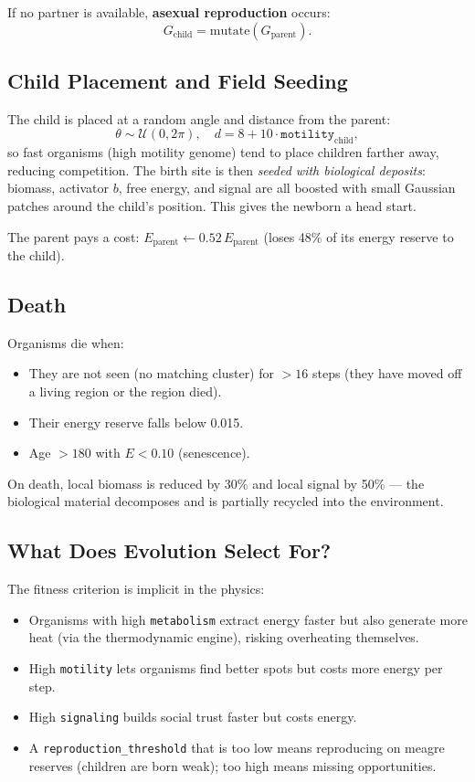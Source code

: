 \documentclass[12pt,a4paper]{article}
\begin{document}
If no partner is available, \textbf{asexual reproduction} occurs:
\[
  G_\text{child} = \text{mutate}(G_\text{parent}).
\]

\subsection{Child Placement and Field Seeding}

The child is placed at a random angle and distance from the parent:
\[
  \theta \sim \mathcal{U}(0, 2\pi),\quad
  d = 8 + 10\cdot\texttt{motility}_\text{child},
\]
so fast organisms (high motility genome) tend to place
children farther away, reducing competition.
The birth site is then \emph{seeded with biological deposits}:
biomass, activator $b$, free energy, and signal are all
boosted with small Gaussian patches around the child's position.
This gives the newborn a head start.

The parent pays a cost:
$E_\text{parent} \leftarrow 0.52\,E_\text{parent}$
(loses 48\% of its energy reserve to the child).

\subsection{Death}

Organisms die when:
\begin{itemize}[nosep]
  \item They are not seen (no matching cluster) for $>16$ steps
    (they have moved off a living region or the region died).
  \item Their energy reserve falls below 0.015.
  \item Age $> 180$ with $E < 0.10$ (senescence).
\end{itemize}

On death, local biomass is reduced by 30\%
and local signal by 50\% — the biological material decomposes
and is partially recycled into the environment.

\subsection{What Does Evolution Select For?}

The fitness criterion is implicit in the physics:
\begin{itemize}[nosep]
  \item Organisms with high \texttt{metabolism} extract energy faster
    but also generate more heat (via the thermodynamic engine),
    risking overheating themselves.
  \item High \texttt{motility} lets organisms find better spots
    but costs more energy per step.
  \item High \texttt{signaling} builds social trust faster
    but costs energy.
  \item A \texttt{reproduction\_threshold} that is too low
    means reproducing on meagre reserves (children are born weak);
    too high means missing opportunities.
\end{itemize}
\end{document}
